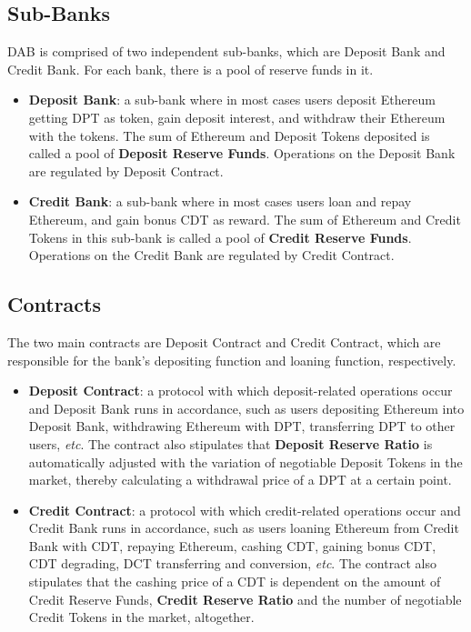 \documentclass[review]{elsarticle}
\begin{document}
\subsection{Sub-Banks}
DAB is comprised of two independent sub-banks, which are Deposit Bank and Credit Bank. For each bank, there is a pool of reserve funds in it.
\begin{itemize} 
   \item \textbf{Deposit Bank}: a sub-bank where in most cases users deposit Ethereum getting DPT as token, gain deposit interest, and withdraw their Ethereum with the tokens. The sum of Ethereum and Deposit Tokens deposited is called a pool of \textbf{Deposit Reserve Funds}. Operations on the Deposit Bank are regulated by Deposit Contract.
   \item \textbf{Credit Bank}: a sub-bank where in most cases users loan and repay Ethereum, and gain bonus CDT as reward. The sum of Ethereum and Credit Tokens in this sub-bank is called a pool of \textbf{Credit Reserve Funds}. Operations on the Credit Bank are regulated by Credit Contract.
\end{itemize}

\subsection{Contracts}
The two main contracts are Deposit Contract and Credit Contract, which are responsible for the bank's depositing function and loaning function, respectively.

\begin{itemize} 
   \item \textbf{Deposit Contract}: a protocol with which deposit-related operations occur and Deposit Bank runs in accordance, such as users depositing Ethereum into Deposit Bank, withdrawing Ethereum with DPT, transferring DPT to other users, \emph{etc}. The contract also stipulates that \textbf{Deposit Reserve Ratio} is automatically adjusted with the variation of negotiable Deposit Tokens in the market, thereby calculating a withdrawal price of a DPT at a certain point.
   \item \textbf{Credit Contract}: a protocol with which credit-related operations occur and Credit Bank runs in accordance, such as users loaning Ethereum from Credit Bank with CDT, repaying Ethereum, cashing CDT, gaining bonus CDT, CDT degrading, DCT transferring and conversion, \emph{etc}. The contract also stipulates that the cashing price of a CDT is dependent on the amount of Credit Reserve Funds, \textbf{Credit Reserve Ratio} and the number of negotiable Credit Tokens in the market, altogether.
\end{itemize}
\end{document}
